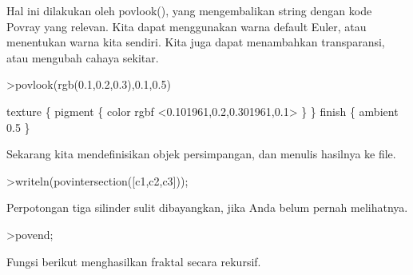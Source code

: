 \documentclass{article}
\begin{document}
\begin{eulernotebook}
\begin{eulercomment}
Hal ini dilakukan oleh povlook(), yang mengembalikan string dengan
kode Povray yang relevan. Kita dapat menggunakan warna default Euler,
atau menentukan warna kita sendiri. Kita juga dapat menambahkan
transparansi, atau mengubah cahaya sekitar.
\end{eulercomment}
\begin{eulerprompt}
>povlook(rgb(0.1,0.2,0.3),0.1,0.5)
\end{eulerprompt}
\begin{euleroutput}
   texture \{ pigment \{ color rgbf <0.101961,0.2,0.301961,0.1> \}  \} 
   finish \{ ambient 0.5 \} 
  
\end{euleroutput}
\begin{eulercomment}
Sekarang kita mendefinisikan objek persimpangan, dan menulis hasilnya
ke file.
\end{eulercomment}
\begin{eulerprompt}
>writeln(povintersection([c1,c2,c3]));
\end{eulerprompt}
\begin{eulercomment}
Perpotongan tiga silinder sulit dibayangkan, jika Anda belum pernah
melihatnya.
\end{eulercomment}
\begin{eulerprompt}
>povend;
\end{eulerprompt}
\begin{eulercomment}
Fungsi berikut menghasilkan fraktal secara rekursif.


\end{eulercomment}
\end{eulernotebook}
\end{document}
